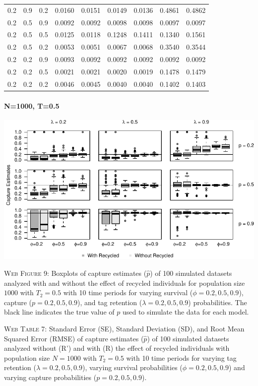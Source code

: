 \documentclass[]{article}
\let\oldparagraph\paragraph
\renewcommand{\paragraph}[1]{\oldparagraph{#1}\mbox{}}
\begin{document}
\begin{table}[ht]
{\begin{tabular}{rrrrrrrrr}
  0.2 & 0.9 & 0.2 & 0.0160 & 0.0151 & 0.0149 & 0.0136 & 0.4861 & 0.4862 \\ 
  0.2 & 0.5 & 0.9 & 0.0092 & 0.0092 & 0.0098 & 0.0098 & 0.0097 & 0.0097 \\ 
  0.2 & 0.5 & 0.5 & 0.0125 & 0.0118 & 0.1248 & 0.1411 & 0.1340 & 0.1561 \\ 
  0.2 & 0.5 & 0.2 & 0.0053 & 0.0051 & 0.0067 & 0.0068 & 0.3540 & 0.3544 \\ 
  0.2 & 0.2 & 0.9 & 0.0093 & 0.0092 & 0.0092 & 0.0092 & 0.0092 & 0.0092 \\ 
  0.2 & 0.2 & 0.5 & 0.0021 & 0.0021 & 0.0020 & 0.0019 & 0.1478 & 0.1479 \\ 
  0.2 & 0.2 & 0.2 & 0.0046 & 0.0045 & 0.0040 & 0.0040 & 0.1402 & 0.1403 \\ 
   \hline
\end{tabular}
}
\endgroup
\end{table}

\newpage

\paragraph{N=1000, T=0.5}\label{n1000-t0.5-1}

\includegraphics{Appendix_BW_files/figure-latex/figure9_capture_GJSTL4-1.pdf}

\textsc{Web Figure 9:} Boxplots of capture estimates (\(\hat{p}\)) of
100 simulated datasets analyzed with and without the effect of recycled
individuals for population size \(1000\) with \(T_2=0.5\) with 10 time
periods for varying survival (\(\phi=0.2,0.5,0.9\)), capture
(\(p=0.2,0.5,0.9\)), and tag retention (\(\lambda=0.2,0.5,0.9\))
probabilities. The black line indicates the true value of \(p\) used to
simulate the data for each model.

\textsc{Web Table 7:} Standard Error (SE), Standard Deviation (SD), and
Root Mean Squared Error (RMSE) of capture estimates (\(\hat{p}\)) of 100
simulated datasets analyzed without (R') and with (R) the effect of
recycled individuals with population size \(N=1000\) with \(T_2=0.5\)
with 10 time periods for varying tag retention
(\(\lambda=0.2,0.5,0.9\)), varying survival probabilities
(\(\phi=0.2,0.5,0.9\)) and varying capture probabilities
(\(p=0.2,0.5,0.9\)).
\end{document}
